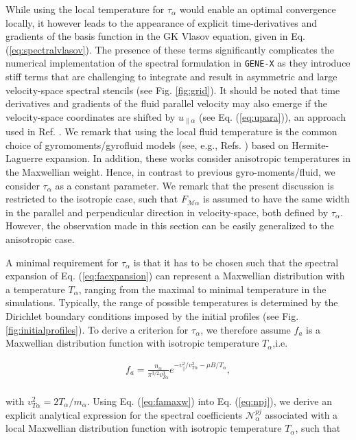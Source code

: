 \documentclass[preprint,12pt]{elsarticle}
\newcommand{\N}{\mathcal{N}_{\alpha}}
\renewcommand{\a}{\alpha}
\begin{document}
While using the local temperature for $\tau_\alpha$ would enable an optimal convergence locally, it however leads to the appearance of explicit time-derivatives and gradients of the basis function in the GK Vlasov equation, given in Eq. (\ref{eq:spectralvlasov}). The presence of these terms significantly complicates the numerical implementation of the spectral formulation in \verb|GENE-X| as they introduce stiff terms that are challenging to integrate and result in asymmetric and large velocity-space spectral stencils (see Fig. \ref{fig:grid}). It should be noted that time derivatives and gradients of the fluid parallel velocity may also emerge if the velocity-space coordinates are shifted by $u_{\parallel \alpha}$ (see Eq. (\ref{eq:upara})), an approach used in Ref. \cite{frei2023b}. We remark that using the local fluid temperature is the common choice of gyromoments/gyrofluid models (see, e.g., Refs. \cite{madsen2013,frei2020}) based on Hermite-Laguerre expansion. In addition, these works consider anisotropic temperatures in the Maxwellian weight. Hence, in contrast to previous gyro-moments/fluid, we consider $\tau_\alpha$ as a constant parameter. We remark that the present discussion is restricted to the isotropic case, such that $F_{\mathcal{M} \alpha}$ is assumed to have the same width in the parallel and perpendicular direction in velocity-space, both defined by $\tau_\alpha$. However, the observation made in this section can be easily generalized to the anisotropic case. 
 
A minimal requirement for $\tau_\a$ is that it has to be chosen such that the spectral expansion of Eq. (\ref{eq:faexpansion}) can represent a Maxwellian distribution with a temperature $T_\a$, ranging from the maximal to minimal temperature in the simulations. Typically, the range of possible temperatures is determined by the Dirichlet boundary conditions imposed by the initial profiles (see Fig. \ref{fig:initialprofiles}). To derive a criterion for $\tau_\a$, we therefore assume $f_a$ is a Maxwellian distribution function with isotropic temperature $T_\a$,i.e.

\begin{align} \label{eq:famaxw}
f_a = \frac{n_\a}{\pi^{3/2} v_{T \a}^3} e^{- v_\parallel^2 / v_{T \a}^2 - \mu B / T_\a},
\end{align}
\\
with $v_{T \a}^2 = 2 T_\a / m_\a$. Using Eq. (\ref{eq:famaxw}) into Eq. (\ref{eq:npj}), we derive an explicit analytical expression for the spectral coefficients $\N^{pj}$ associated with a local Maxwellian distribution function with isotropic temperature $T_\a$, such that
\end{document}
